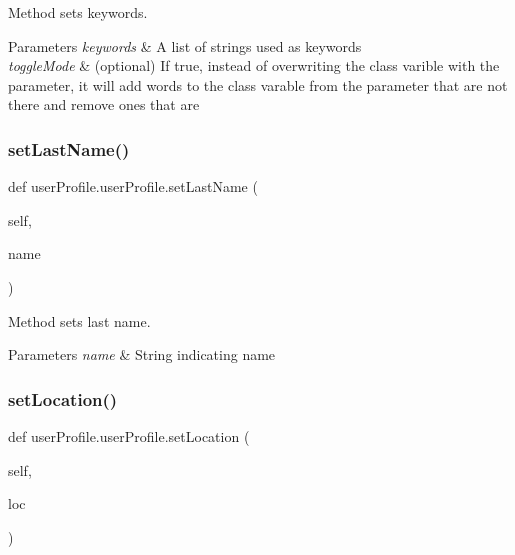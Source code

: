 Method sets keywords. 


\begin{DoxyParams}{Parameters}
{\em keywords} & A list of strings used as keywords \\
\hline
{\em toggle\+Mode} & (optional) If true, instead of overwriting the class varible with the parameter, it will add words to the class varable from the parameter that are not there and remove ones that are \\
\hline
\end{DoxyParams}
\mbox{\label{classuserProfile_1_1userProfile_ab6c77d7b146fbf8d9ffb79ae0d6a2c00}} 
\subsubsection{\texorpdfstring{set\+Last\+Name()}{setLastName()}}
{\footnotesize\ttfamily def user\+Profile.\+user\+Profile.\+set\+Last\+Name (\begin{DoxyParamCaption}\item[{}]{self,  }\item[{}]{name }\end{DoxyParamCaption})}



Method sets last name. 


\begin{DoxyParams}{Parameters}
{\em name} & String indicating name \\
\hline
\end{DoxyParams}
\mbox{\label{classuserProfile_1_1userProfile_ad8b26311a1d9adf8b7b29c7d7ab73358}} 
\subsubsection{\texorpdfstring{set\+Location()}{setLocation()}}
{\footnotesize\ttfamily def user\+Profile.\+user\+Profile.\+set\+Location (\begin{DoxyParamCaption}\item[{}]{self,  }\item[{}]{loc }\end{DoxyParamCaption})}



